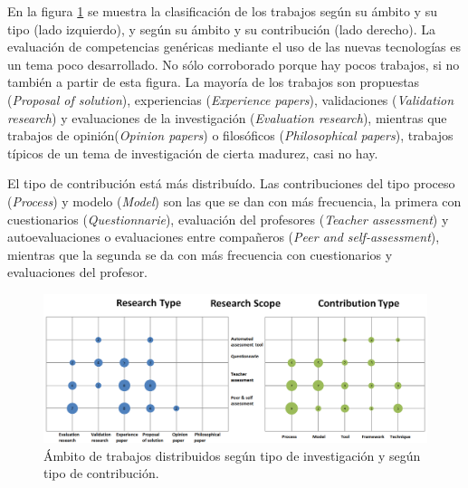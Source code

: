 
En la figura \ref{fig:Burble} se muestra la clasificación de los trabajos según su ámbito y su tipo (lado izquierdo), y según su ámbito y su contribución (lado derecho). La evaluación de competencias genéricas mediante el uso de las nuevas tecnologías es un tema poco desarrollado. No sólo corroborado porque hay pocos trabajos, si no también a partir de esta figura. La mayoría de los trabajos son propuestas (\emph{Proposal of solution}), experiencias (\emph{Experience papers}), validaciones (\emph{Validation research}) y evaluaciones de la investigación (\emph{Evaluation research}), mientras que trabajos de opinión(\emph{Opinion papers}) o filosóficos (\emph{Philosophical papers}), trabajos típicos de un tema de investigación de cierta madurez, casi no hay.

El tipo de contribución está más distribuído. Las contribuciones del tipo proceso (\emph{Process}) y modelo (\emph{Model}) son las que se dan con más frecuencia, la primera con cuestionarios (\emph{Questionnarie}), evaluación del profesores (\emph{Teacher assessment}) y autoevaluaciones o evaluaciones entre compañeros (\emph{Peer and self-assessment}), mientras que la segunda se da con más frecuencia con cuestionarios y evaluaciones del profesor. 

\pagestyle{empty}
\begin{landscape}
\begin{figure}[H]
  \begin{center}
    \includegraphics[scale=0.4]{Burbujas.png}
  \end{center}
  \caption{Ámbito de trabajos distribuidos según tipo de investigación y según tipo de contribución.}
  \label{fig:Burble}
\end{figure}
\end{landscape}
\pagestyle{fancy}

